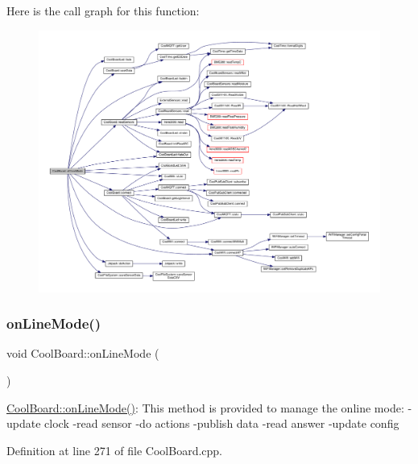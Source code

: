 Here is the call graph for this function\+:\nopagebreak
\begin{figure}[H]
\begin{center}
\leavevmode
\includegraphics[width=350pt]{d7/df9/class_cool_board_ae6b5e1274d760462290192acea4adca8_cgraph}
\end{center}
\end{figure}
\mbox{\label{class_cool_board_aa0bbc4bc605e35618d18e68795c61363}} 
\subsubsection{\texorpdfstring{on\+Line\+Mode()}{onLineMode()}}
{\footnotesize\ttfamily void Cool\+Board\+::on\+Line\+Mode (\begin{DoxyParamCaption}{ }\end{DoxyParamCaption})}

\hyperlink{class_cool_board_aa0bbc4bc605e35618d18e68795c61363}{Cool\+Board\+::on\+Line\+Mode()}\+: This method is provided to manage the online mode\+: -\/update clock -\/read sensor -\/do actions -\/publish data -\/read answer -\/update config 

Definition at line 271 of file Cool\+Board.\+cpp.


